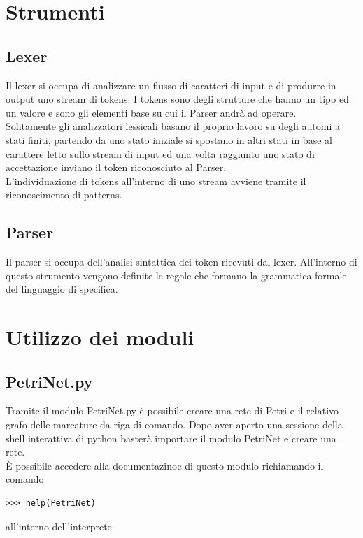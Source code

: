 \documentclass[italian,12pt]{book}
\begin{document}
\section{Strumenti}
\subsection{Lexer}
Il lexer si occupa di analizzare un flusso di caratteri di input e di 
produrre in output uno stream di tokens. I tokens sono degli strutture che hanno 
un tipo ed un valore e sono gli elementi base su cui il Parser andrà 
ad operare.\\
Solitamente gli analizzatori lessicali basano il proprio lavoro su degli 
automi a stati finiti, partendo da uno stato iniziale si spostano in altri stati 
in base al carattere letto sullo stream di input ed una volta raggiunto uno stato di 
accettazione inviano il token riconosciuto al Parser.\\
L'individuazione di tokens all'interno di uno stream avviene tramite il riconoscimento di patterns.
\subsection{Parser}
Il parser si occupa dell'analisi sintattica dei token
ricevuti dal lexer. All'interno di questo strumento
vengono definite le regole che formano la grammatica
formale del linguaggio di specifica.
%
\section{Utilizzo dei moduli}
\subsection{PetriNet.py}
Tramite il modulo PetriNet.py è possibile creare una rete di Petri e il 
relativo grafo delle marcature da riga di comando. Dopo aver aperto una 
sessione della shell interattiva di python basterà importare il modulo
PetriNet e creare una rete.\\
È possibile accedere alla documentazinoe di questo modulo richiamando il 
comando \begin{verbatim}>>> help(PetriNet)\end{verbatim} all'interno dell'interprete.
\end{document}
